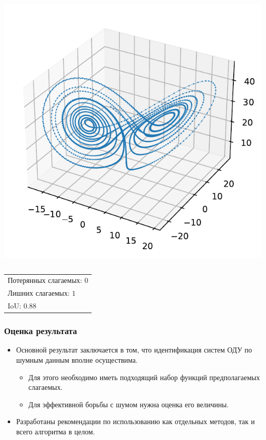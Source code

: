 \documentclass[pdf, hyperref={unicode}, aspectratio=169]{beamer}
\begin{document}
\begin{frame}
\begin{onlyenv}
\begin{columns}
  \includegraphics[height=\linewidth]{img/ex4_res}
\end{columns}
\vfill
\begin{center}
  \begin{tabular}{l}
  Потерянных слагаемых: $0$\\
  Лишних слагаемых: $1$\\
  IoU: $0.88$\\
  \end{tabular}
\end{center}
\end{onlyenv}
\end{frame}

\begin{frame}
\frametitle{Оценка результата}

\begin{itemize}
\item Основной результат заключается в том, что идентификация систем ОДУ по шумным данным вполне осуществима.
\begin{itemize}
\item Для этого необходимо иметь подходящий набор функций предполагаемых слагаемых.
\item Для эффективной борьбы с шумом нужна оценка его величины.
\end{itemize}
\item Разработаны рекомендации по использованию как отдельных методов, так и всего алгоритма в целом.
\end{itemize}
\end{frame}
\end{document}
